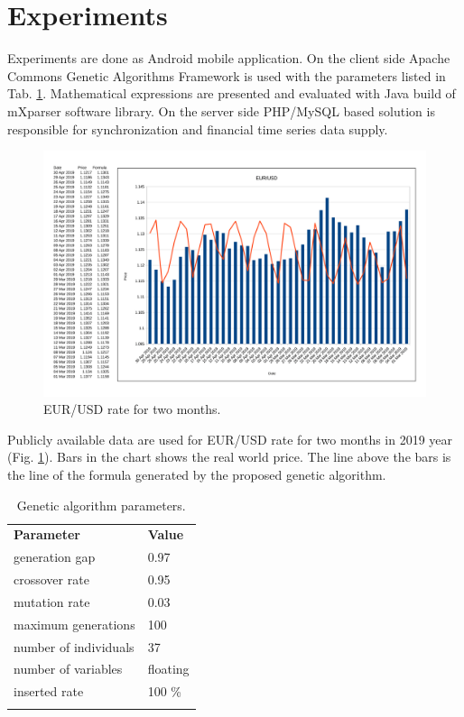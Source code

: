 \documentclass[graybox]{svmult}
\begin{document}
\section{Experiments} \label{Experiments}

Experiments are done as Android mobile application. On the client side Apache Commons Genetic Algorithms Framework \cite{apache01} is used with the parameters listed in Tab. \ref{tab01}. Mathematical expressions are presented and evaluated with Java build of mXparser \cite{gromada01} software library. On the server side PHP/MySQL based solution \cite{balabanov03} is responsible for synchronization and financial time series data supply. 

\begin{figure}[b]
\sidecaption
\includegraphics[scale=0.12]{fig01.png}
\caption{EUR/USD rate for two months.}
\label{fig01}
\end{figure}

Publicly available data are used for EUR/USD rate for two months in 2019 year (Fig. \ref{fig01}). Bars in the chart shows the real world price. The line above the bars is the line of the formula generated by the proposed genetic algorithm. 

\begin{table}
\caption{Genetic algorithm parameters.}
\label{tab01}
\begin{tabular}{p{6.9cm}p{4.4cm}}
\hline\noalign{\smallskip}
\textbf{Parameter} & \textbf{Value} \\
\noalign{\smallskip}\svhline\noalign{\smallskip}
generation gap & 0.97 \\
crossover rate & 0.95 \\
mutation rate & 0.03 \\
maximum generations & 100 \\
number of individuals & 37 \\
number of variables & floating \\
inserted rate & 100 \% \\
\noalign{\smallskip}\hline\noalign{\smallskip}
\end{tabular}
\end{table}
\end{document}
